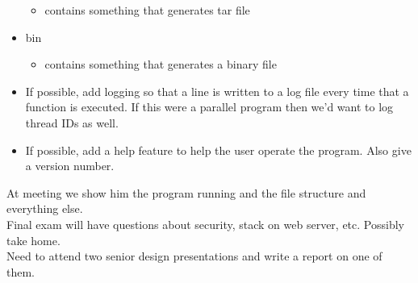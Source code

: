\documentclass{report}
\begin{document}
\begin{itemize}
\begin{itemize}
	\item contains something that generates tar file
	\end{itemize}
\item bin 
	\begin{itemize}
	\item contains something that generates a binary file
	\end{itemize}
\item If possible, add logging so that a line is written to a log file every time that a function is executed. If this were a parallel program then we'd want to log thread IDs as well.
\item If possible, add a help feature to help the user operate the program. Also give a version number.
\end{itemize}
At meeting we show him the program running and the file structure and everything else.\\
Final exam will have questions about security, stack on web server, etc. Possibly take home.\\
Need to attend two senior design presentations and write a report on one of them.
\end{document}
